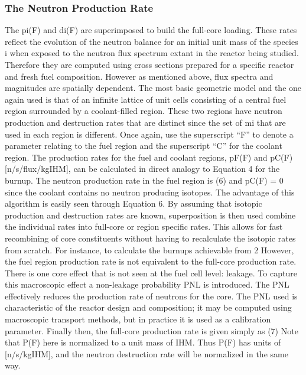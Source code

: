 \subsubsection{The Neutron Production Rate}
\label{1g_sec:p_rate}
 The pi(F) and di(F) are superimposed to build the full-core loading.  These rates reflect the evolution of the neutron balance for an initial unit mass of the species i when exposed to the neutron flux spectrum extant in the reactor being studied.  Therefore they are computed using cross sections prepared for a specific reactor and fresh fuel composition.
However as mentioned above, flux spectra and magnitudes are spatially dependent.  The most basic geometric model and the one again used is that of an infinite lattice of unit cells consisting of a central fuel region surrounded by a coolant-filled region.  These two regions have neutron production and destruction rates that are distinct since the set of mi that are used in each region is different.  Once again, use the superscript “F” to denote a parameter relating to the fuel region and the superscript “C” for the coolant region. 
The production rates for the fuel and coolant regions, pF(F) and pC(F) [n/s/flux/kgIHM], can be calculated in direct analogy to Equation 4 for the burnup.  The neutron production rate in the fuel region is 
                                (6)
and pC(F) = 0 since the coolant contains no neutron producing isotopes.  
The advantage of this algorithm is easily seen through Equation 6.  By assuming that isotopic production and destruction rates are known, superposition is then used combine the individual rates into full-core or region specific rates.  This allows for fast recombining of core constituents without having to recalculate the isotopic rates from scratch.  For instance, to calculate the burnups achievable from 2%
However, the fuel region production rate is not equivalent to the full-core production rate.  There is one core effect that is not seen at the fuel cell level: leakage.  To capture this macroscopic effect a non-leakage probability PNL is introduced.  The PNL effectively reduces the production rate of neutrons for the core. The PNL used is characteristic of the reactor design and composition; it may be computed using macroscopic transport methods, but in practice it is used as a calibration parameter.  Finally then, the full-core production rate is given simply as 
                                        (7)
Note that P(F) here is normalized to a unit mass of IHM.  Thus P(F) has units of [n/s/kgIHM], and the neutron destruction rate will be normalized in the same way.



